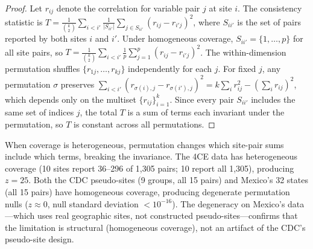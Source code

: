 \documentclass{article}
\begin{document}
\begin{proof}
Let $r_{ij}$ denote the correlation for variable pair $j$ at site $i$.  The consistency statistic is $T = \frac{1}{\binom{k}{2}} \sum_{i < i'} \frac{1}{|S_{ii'}|} \sum_{j \in S_{ii'}} (r_{ij} - r_{i'j})^2$, where $S_{ii'}$ is the set of pairs reported by both sites $i$ and $i'$.
Under homogeneous coverage, $S_{ii'} = \{1, \ldots, p\}$ for all site pairs, so $T = \frac{1}{\binom{k}{2}} \sum_{i < i'} \frac{1}{p} \sum_{j=1}^{p} (r_{ij} - r_{i'j})^2$.
The within-dimension permutation shuffles $\{r_{1j}, \ldots, r_{kj}\}$ independently for each $j$.
For fixed $j$, any permutation $\sigma$ preserves $\sum_{i<i'} (r_{\sigma(i),j} - r_{\sigma(i'),j})^2 = k \sum_i r_{ij}^2 - (\sum_i r_{ij})^2$, which depends only on the multiset $\{r_{ij}\}_{i=1}^k$.
Since every pair $S_{ii'}$ includes the same set of indices $j$, the total $T$ is a sum of terms each invariant under the permutation, so $T$ is constant across all permutations.
\end{proof}

When coverage is heterogeneous, permutation changes which site-pair sums include which terms, breaking the invariance.  The 4CE data has heterogeneous coverage (10 sites report 36--296 of 1,305 pairs; 10 report all 1,305), producing $z = 25$.  Both the CDC pseudo-sites (9 groups, all 15 pairs) and Mexico's 32 states (all 15 pairs) have homogeneous coverage, producing degenerate permutation nulls ($z \approx 0$, null standard deviation $< 10^{-16}$).  The degeneracy on Mexico's data---which uses real geographic sites, not constructed pseudo-sites---confirms that the limitation is structural (homogeneous coverage), not an artifact of the CDC's pseudo-site design.



\end{document}
